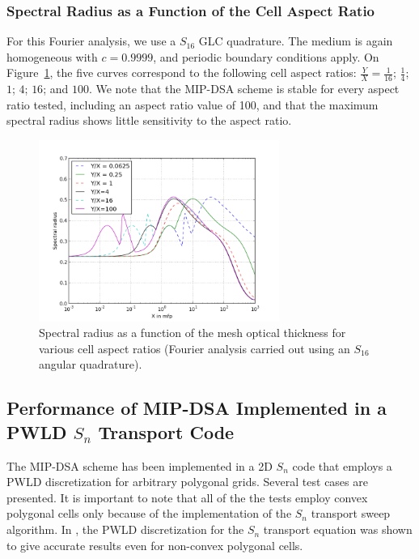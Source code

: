 \documentclass[preprint,10pt]{elsarticle}
\renewcommand{\(}{\left(}
\renewcommand{\)}{\right)}
\renewcommand{\[}{\left[}
\renewcommand{\]}{\right]}
\newcommand{\sn}{\ensuremath{S_n}\xspace}
\begin{document}
\subsubsection{Spectral Radius as a Function of the Cell Aspect Ratio}
For this Fourier analysis, we use a $S_{16}$ GLC quadrature. The medium is
again homogeneous with $c=0.9999$, and periodic boundary conditions apply. 
On Figure~\ref {fig_fa_ar}, the five curves correspond to the following cell aspect 
ratios: $\frac{Y}{X}=\frac{1}{16}$; $\frac{1}{4}$;
$1$; $4$; $16$; and $100$.
We note that the MIP-DSA scheme is stable for every aspect ratio tested, including an
aspect ratio value of 100, 
and that the maximum spectral radius shows little sensitivity to the aspect ratio.
\begin{figure}[!htbp]
  \centering
  \includegraphics[width=0.7\textwidth]{aspect_ratio_9999_2}
  \caption{Spectral radius as a function of the mesh optical thickness for various cell aspect ratios (Fourier analysis carried out using an $S_{16}$ angular quadrature).}
  \label{fig_fa_ar}
\end{figure}

\subsection{Performance of MIP-DSA Implemented in a PWLD $S_n$ Transport Code}
The MIP-DSA scheme has been implemented in a 2D \sn code that employs a PWLD discretization
for arbitrary polygonal grids. Several test cases are presented. It is important
to note that all of the the tests employ convex polygonal cells only because of the 
implementation of the \sn transport sweep algorithm. In \cite{pwld_3d}, the PWLD discretization for the
\sn transport equation was shown to give accurate results even for non-convex polygonal cells.
\end{document}
